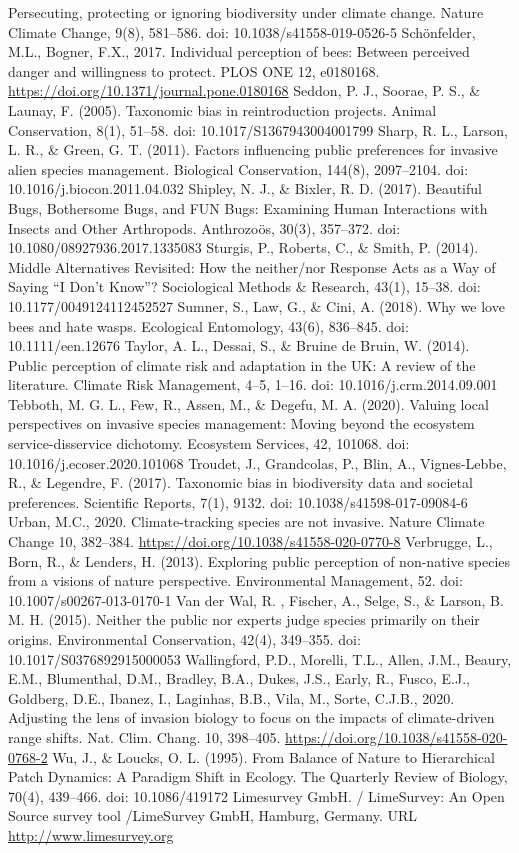 \documentclass[
]{article}
\begin{document}
Persecuting, protecting or ignoring biodiversity under climate change.
Nature Climate Change, 9(8), 581--586. doi: 10.1038/s41558-019-0526-5
Schönfelder, M.L., Bogner, F.X., 2017. Individual perception of bees:
Between perceived danger and willingness to protect. PLOS ONE 12,
e0180168. \url{https://doi.org/10.1371/journal.pone.0180168} Seddon, P.
J., Soorae, P. S., \& Launay, F. (2005). Taxonomic bias in
reintroduction projects. Animal Conservation, 8(1), 51--58. doi:
10.1017/S1367943004001799 Sharp, R. L., Larson, L. R., \& Green, G. T.
(2011). Factors influencing public preferences for invasive alien
species management. Biological Conservation, 144(8), 2097--2104. doi:
10.1016/j.biocon.2011.04.032 Shipley, N. J., \& Bixler, R. D. (2017).
Beautiful Bugs, Bothersome Bugs, and FUN Bugs: Examining Human
Interactions with Insects and Other Arthropods. Anthrozoös, 30(3),
357--372. doi: 10.1080/08927936.2017.1335083 Sturgis, P., Roberts, C.,
\& Smith, P. (2014). Middle Alternatives Revisited: How the neither/nor
Response Acts as a Way of Saying ``I Don't Know''? Sociological Methods
\& Research, 43(1), 15--38. doi: 10.1177/0049124112452527 Sumner, S.,
Law, G., \& Cini, A. (2018). Why we love bees and hate wasps. Ecological
Entomology, 43(6), 836--845. doi: 10.1111/een.12676 Taylor, A. L.,
Dessai, S., \& Bruine de Bruin, W. (2014). Public perception of climate
risk and adaptation in the UK: A review of the literature. Climate Risk
Management, 4--5, 1--16. doi: 10.1016/j.crm.2014.09.001 Tebboth, M. G.
L., Few, R., Assen, M., \& Degefu, M. A. (2020). Valuing local
perspectives on invasive species management: Moving beyond the ecosystem
service-disservice dichotomy. Ecosystem Services, 42, 101068. doi:
10.1016/j.ecoser.2020.101068 Troudet, J., Grandcolas, P., Blin, A.,
Vignes-Lebbe, R., \& Legendre, F. (2017). Taxonomic bias in biodiversity
data and societal preferences. Scientific Reports, 7(1), 9132. doi:
10.1038/s41598-017-09084-6 Urban, M.C., 2020. Climate-tracking species
are not invasive. Nature Climate Change 10, 382--384.
\url{https://doi.org/10.1038/s41558-020-0770-8} Verbrugge, L., Born, R.,
\& Lenders, H. (2013). Exploring public perception of non-native species
from a visions of nature perspective. Environmental Management, 52. doi:
10.1007/s00267-013-0170-1 Van der Wal, R. , Fischer, A., Selge, S., \&
Larson, B. M. H. (2015). Neither the public nor experts judge species
primarily on their origins. Environmental Conservation, 42(4), 349--355.
doi: 10.1017/S0376892915000053 Wallingford, P.D., Morelli, T.L., Allen,
J.M., Beaury, E.M., Blumenthal, D.M., Bradley, B.A., Dukes, J.S., Early,
R., Fusco, E.J., Goldberg, D.E., Ibanez, I., Laginhas, B.B., Vila, M.,
Sorte, C.J.B., 2020. Adjusting the lens of invasion biology to focus on
the impacts of climate-driven range shifts. Nat. Clim. Chang. 10,
398--405. \url{https://doi.org/10.1038/s41558-020-0768-2} Wu, J., \&
Loucks, O. L. (1995). From Balance of Nature to Hierarchical Patch
Dynamics: A Paradigm Shift in Ecology. The Quarterly Review of Biology,
70(4), 439--466. doi: 10.1086/419172 Limesurvey GmbH. / LimeSurvey: An
Open Source survey tool /LimeSurvey GmbH, Hamburg, Germany. URL
\url{http://www.limesurvey.org}
\end{document}

